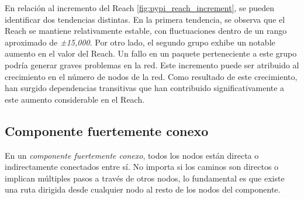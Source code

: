 En relación al incremento del Reach \ref{fig:pypi_reach_increment}, se pueden identificar dos tendencias distintas. 
En la primera
tendencia, se observa que el Reach se mantiene relativamente estable, con fluctuaciones dentro de un
rango aproximado de \textit{±15,000}. Por otro lado, el segundo grupo exhibe un notable aumento en el valor
del Reach. Un fallo en un paquete perteneciente a este grupo podría generar graves problemas en la red.
Este incremento puede ser atribuido al crecimiento en el número de nodos de la red. Como resultado de
este crecimiento, han surgido dependencias transitivas que han contribuido significativamente a este
aumento considerable en el Reach.

\newpage


\subsection{Componente fuertemente conexo}

En un \textit{componente fuertemente conexo}, todos los nodos están directa o indirectamente conectados
entre sí. No importa si los caminos son directos o implican múltiples pasos a través de otros nodos,
lo fundamental es que existe una ruta dirigida desde cualquier nodo al resto de los nodos del componente.

